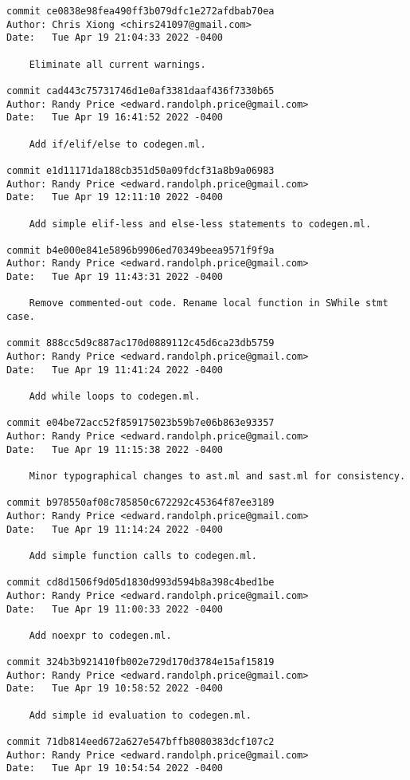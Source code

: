 {\begin{verbatim}
commit ce0838e98fea490ff3b079dfc1e272afdbab70ea
Author: Chris Xiong <chirs241097@gmail.com>
Date:   Tue Apr 19 21:04:33 2022 -0400

    Eliminate all current warnings.

commit cad443c75731746d1e0af3381daaf436f7330b65
Author: Randy Price <edward.randolph.price@gmail.com>
Date:   Tue Apr 19 16:41:52 2022 -0400

    Add if/elif/else to codegen.ml.

commit e1d11171da188cb351d50a09fdcf31a8b9a06983
Author: Randy Price <edward.randolph.price@gmail.com>
Date:   Tue Apr 19 12:11:10 2022 -0400

    Add simple elif-less and else-less statements to codegen.ml.

commit b4e000e841e5896b9906ed70349beea9571f9f9a
Author: Randy Price <edward.randolph.price@gmail.com>
Date:   Tue Apr 19 11:43:31 2022 -0400

    Remove commented-out code. Rename local function in SWhile stmt case.

commit 888cc5d9c887ac170d0889112c45d6ca23db5759
Author: Randy Price <edward.randolph.price@gmail.com>
Date:   Tue Apr 19 11:41:24 2022 -0400

    Add while loops to codegen.ml.

commit e04be72acc52f859175023b59b7e06b863e93357
Author: Randy Price <edward.randolph.price@gmail.com>
Date:   Tue Apr 19 11:15:38 2022 -0400

    Minor typographical changes to ast.ml and sast.ml for consistency.

commit b978550af08c785850c672292c45364f87ee3189
Author: Randy Price <edward.randolph.price@gmail.com>
Date:   Tue Apr 19 11:14:24 2022 -0400

    Add simple function calls to codegen.ml.

commit cd8d1506f9d05d1830d993d594b8a398c4bed1be
Author: Randy Price <edward.randolph.price@gmail.com>
Date:   Tue Apr 19 11:00:33 2022 -0400

    Add noexpr to codegen.ml.

commit 324b3b921410fb002e729d170d3784e15af15819
Author: Randy Price <edward.randolph.price@gmail.com>
Date:   Tue Apr 19 10:58:52 2022 -0400

    Add simple id evaluation to codegen.ml.

commit 71db814eed672a627e547bffb8080383dcf107c2
Author: Randy Price <edward.randolph.price@gmail.com>
Date:   Tue Apr 19 10:54:54 2022 -0400


\end{verbatim}}
